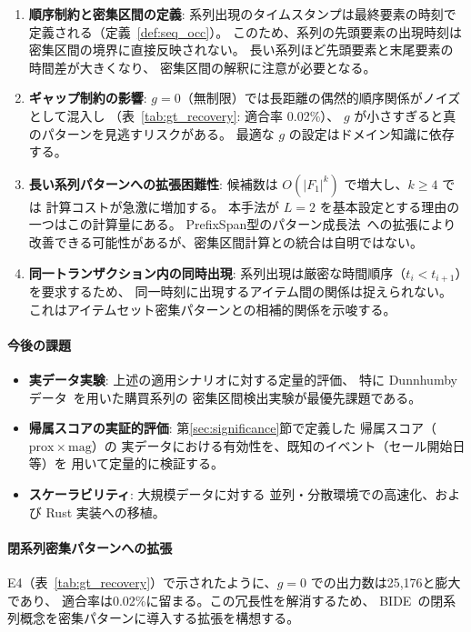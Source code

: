 \documentclass[11pt,a4paper]{article}
\begin{document}
\begin{enumerate}[leftmargin=2em]
  \item \textbf{順序制約と密集区間の定義}:
        系列出現のタイムスタンプは最終要素の時刻で定義される（定義~\ref{def:seq_occ}）。
        このため、系列の先頭要素の出現時刻は密集区間の境界に直接反映されない。
        長い系列ほど先頭要素と末尾要素の時間差が大きくなり、
        密集区間の解釈に注意が必要となる。
  \item \textbf{ギャップ制約の影響}:
        $g = 0$（無制限）では長距離の偶然的順序関係がノイズとして混入し
        （表~\ref{tab:gt_recovery}: 適合率 0.02\%）、
        $g$ が小さすぎると真のパターンを見逃すリスクがある。
        最適な $g$ の設定はドメイン知識に依存する。
  \item \textbf{長い系列パターンへの拡張困難性}:
        候補数は $O(|F_1|^k)$ で増大し、$k \ge 4$ では
        計算コストが急激に増加する。
        本手法が $L = 2$ を基本設定とする理由の一つはこの計算量にある。
        PrefixSpan型のパターン成長法~\cite{Pei2001}への拡張により
        改善できる可能性があるが、密集区間計算との統合は自明ではない。
  \item \textbf{同一トランザクション内の同時出現}:
        系列出現は厳密な時間順序（$t_i < t_{i+1}$）を要求するため、
        同一時刻に出現するアイテム間の関係は捉えられない。
        これはアイテムセット密集パターンとの相補的関係を示唆する。
\end{enumerate}

\paragraph{今後の課題}
\begin{itemize}[leftmargin=1.5em]
  \item \textbf{実データ実験}: 上述の適用シナリオに対する定量的評価、
        特に Dunnhumby データ~\cite{Dunnhumby2014}を用いた購買系列の
        密集区間検出実験が最優先課題である。
  \item \textbf{帰属スコアの実証的評価}: 第\ref{sec:significance}節で定義した
        帰属スコア（$\mathrm{prox} \times \mathrm{mag}$）の
        実データにおける有効性を、既知のイベント（セール開始日等）を
        用いて定量的に検証する。
  \item \textbf{スケーラビリティ}: 大規模データに対する
        並列・分散環境での高速化、および Rust 実装への移植。
\end{itemize}

\paragraph{閉系列密集パターンへの拡張}
E4（表~\ref{tab:gt_recovery}）で示されたように、$g=0$ での出力数は25,176と膨大であり、
適合率は0.02\%に留まる。この冗長性を解消するため、
BIDE~\cite{Wang2004}の閉系列概念を密集パターンに導入する拡張を構想する。
\end{document}
